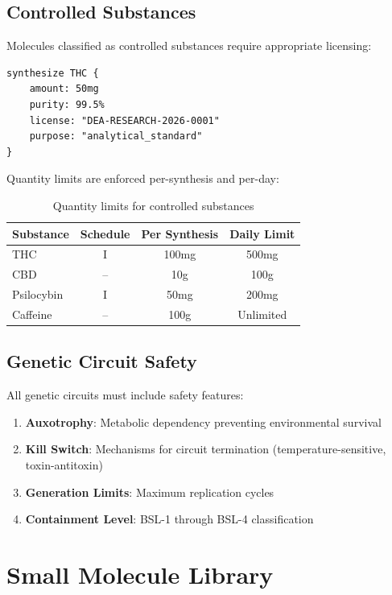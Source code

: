 \documentclass[12pt,a4paper]{article}
\begin{document}
\subsection{Controlled Substances}

Molecules classified as controlled substances require appropriate licensing:

\begin{lstlisting}[style=biodsl,caption={Controlled substance synthesis with licensing}]
synthesize THC {
    amount: 50mg
    purity: 99.5%
    license: "DEA-RESEARCH-2026-0001"
    purpose: "analytical_standard"
}
\end{lstlisting}

Quantity limits are enforced per-synthesis and per-day:

\begin{table}[H]
\centering
\begin{tabular}{lccc}
\toprule
\textbf{Substance} & \textbf{Schedule} & \textbf{Per Synthesis} & \textbf{Daily Limit} \\
\midrule
THC & I & 100mg & 500mg \\
CBD & -- & 10g & 100g \\
Psilocybin & I & 50mg & 200mg \\
Caffeine & -- & 100g & Unlimited \\
\bottomrule
\end{tabular}
\caption{Quantity limits for controlled substances}
\end{table}

\subsection{Genetic Circuit Safety}

All genetic circuits must include safety features:

\begin{enumerate}
    \item \textbf{Auxotrophy}: Metabolic dependency preventing environmental survival
    \item \textbf{Kill Switch}: Mechanisms for circuit termination (temperature-sensitive, toxin-antitoxin)
    \item \textbf{Generation Limits}: Maximum replication cycles
    \item \textbf{Containment Level}: BSL-1 through BSL-4 classification
\end{enumerate}

\section{Small Molecule Library}
\end{document}
